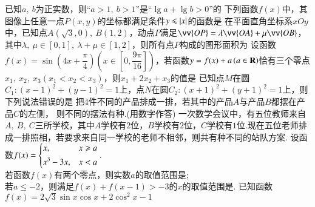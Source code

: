\documentclass{BHCexam}
\begin{document}
	\fubiaoti{}
	\maketitle
	\begin{questions}
		\qs 已知$ a,~b $为正实数，则$ “a>1,~b>1” $是$ “\lg a+\lg b>0” $的\xx
		\qs 下列函数$f(x)$中，其图像上任意一点$ P(x,y) $的坐标都满足条件$ y\le \abs{x} $的函数是\xx
		\qs 在平面直角坐标系$xOy$中，已知点$ A\left(\sqrt{3},0\right) ,~B\left(1,2\right)$，动点$P$满足$ \vv{OP}=\lambda\vv{OA}+\mu\vv{OB} $，其中$ \lambda ,~\mu\in\left[0,1\right] ,~\lambda+\mu\in\left[1,2\right]$，则所有点$ P $构成的图形面积为\xx
		\qs 设函数$f(x)=\sin\left(4x+\dfrac{\pi}{4}\right)\left(x\in\left[0,\dfrac{9\pi}{16}\right]\right)$，若函数$ y=f(x)+a\left(a\inR\right) $恰有三个零点$ x_1,\ x_2,\ x_3 \left(x_1<x_2<x_3\right)$，则$ x_1+2x_2+x_3 $的值是\xx
		\qs 已知点$ M $在圆$ C_1: \left(x-1\right)^2+\left(y-1\right)^2=1$上，点$ N $在圆$ C_2:\left(x+1\right)^2+\left(y+1\right)^2 =1$上，则下列说法错误的是\xx
		\qs 把$ 4 $件不同的产品排成一排，若其中的产品$ A $与产品$ B $都摆在产品$ C $的左侧， 则不同的摆法有\tk 种.(用数字作答)
		\qs 一次数学会议中，有五位教师来自$ A,~B,~C $三所学校，其中$ A $学校有$2$位，$ B $学校有$ 2 $位，$ C $学校有$ 1 $位.现在五位老师排成一排照相，若要求来自同一学校的老师不相邻，则共有\tk 种不同的站队方案.
		\qs 设函数$f(x)=\begin{dcases}
			x,&x\ge a\\
			x^3-3x,&x<a
		\end{dcases}.$\\
		 若函数$f(x)$有两个零点，则实数$ a $的取值范围是\tk;\\
		 若$ a\le -2 $，则满足$ f(x)+f(x-1)>-3 $的$ x $的取值范围是\tk.
		\qs 已知函数$f(x)=2\sqrt{3}\sin x\cos x+2\cos ^2x-1$
\end{questions}
\end{document}
